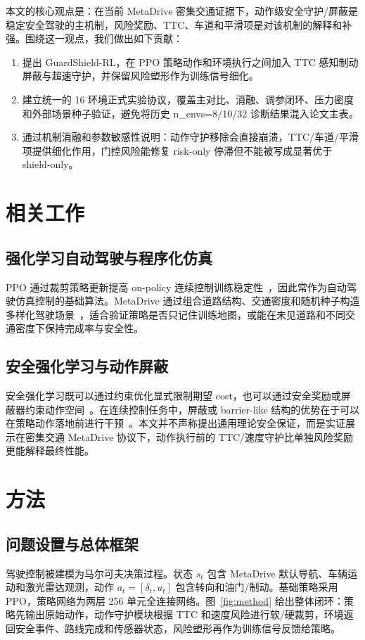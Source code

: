 \documentclass[conference,a4paper]{IEEEtran}
\newcommand{\method}{GuardShield-RL}
\begin{document}
本文的核心观点是：在当前 MetaDrive 密集交通证据下，动作级安全守护/屏蔽是稳定安全驾驶的主机制，风险奖励、TTC、车道和平滑项是对该机制的解释和补强。围绕这一观点，我们做出如下贡献：
\begin{enumerate}
  \item 提出 \method{}，在 PPO 策略动作和环境执行之间加入 TTC 感知制动屏蔽与超速守护，并保留风险塑形作为训练信号细化。
  \item 建立统一的 16 环境正式实验协议，覆盖主对比、消融、调参闭环、压力密度和外部场景种子验证，避免将历史 n\_envs=8/10/32 诊断结果混入论文主表。
  \item 通过机制消融和参数敏感性说明：动作守护移除会直接崩溃，TTC/车道/平滑项提供细化作用，门控风险能修复 risk-only 停滞但不能被写成显著优于 shield-only。
\end{enumerate}

\section{相关工作}
\subsection{强化学习自动驾驶与程序化仿真}
PPO 通过裁剪策略更新提高 on-policy 连续控制训练稳定性~\cite{schulman2017ppo}，因此常作为自动驾驶仿真控制的基础算法。MetaDrive 通过组合道路结构、交通密度和随机种子构造多样化驾驶场景~\cite{li2022metadrive}，适合验证策略是否只记住训练地图，或能在未见道路和不同交通密度下保持完成率与安全性。

\subsection{安全强化学习与动作屏蔽}
安全强化学习既可以通过约束优化显式限制期望 cost，也可以通过安全奖励或屏蔽器约束动作空间~\cite{garcia2015safe,achiam2017cpo,alshiekh2018shielding}。在连续控制任务中，屏蔽或 barrier-like 结构的优势在于可以在策略动作落地前进行干预~\cite{cheng2019barrier}。本文并不声称提出通用理论安全保证，而是实证展示在密集交通 MetaDrive 协议下，动作执行前的 TTC/速度守护比单独风险奖励更能解释最终性能。

\section{方法}
\subsection{问题设置与总体框架}
驾驶控制被建模为马尔可夫决策过程。状态 $s_t$ 包含 MetaDrive 默认导航、车辆运动和激光雷达观测，动作 $a_t=[\delta_t,u_t]$ 包含转向和油门/制动。基础策略采用 PPO，策略网络为两层 256 单元全连接网络。图~\ref{fig:method} 给出整体闭环：策略先输出原始动作，动作守护模块根据 TTC 和速度风险进行软/硬裁剪，环境返回安全事件、路线完成和传感器状态，风险塑形再作为训练信号反馈给策略。
\end{document}
